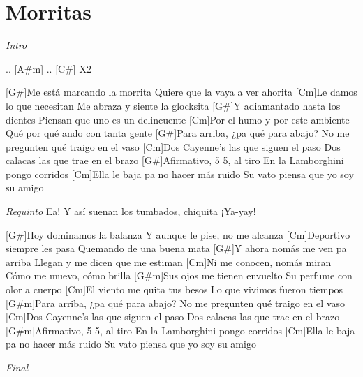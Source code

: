 \section{Morritas}

\noindent
\vspace{1cm}

\begin{guitar}
	\begin{multicols}{2}

		\textit{Intro}\par
		[G#]  ..  [A#m]  ..  [C#] X2

		[G#]Me está marcando la morrita
		Quiere que la vaya a ver ahorita
		[Cm]Le damos lo que necesitan
		Me abraza y siente la glocksita
		[G#]Y adiamantado hasta los dientes
		Piensan que uno es un delincuente
		[Cm]Por el humo y por este ambiente
		Qué por qué ando con tanta gente
		[G#]Para arriba, ¿pa qué para abajo?
		No me pregunten qué traigo en el vaso
		[Cm]Dos Cayenne's las que siguen el paso
		Dos calacas las que trae en el brazo
		[G#]Afirmativo, 5 5, al tiro
		En la Lamborghini pongo corridos
		[Cm]Ella le baja pa no hacer más ruido
		Su vato piensa que yo soy su amigo

		\par
		\textit{Requinto}
		Ea!
		Y así suenan los tumbados, chiquita
		¡Ya-yay!
		\par

		[G#]Hoy dominamos la balanza
		Y aunque le pise, no me alcanza
		[Cm]Deportivo siempre les pasa
		Quemando de una buena mata
		[G#]Y ahora nomás me ven pa arriba
		Llegan y me dicen que me estiman
		[Cm]Ni me conocen, nomás miran
		Cómo me muevo, cómo brilla
		[G#m]Sus ojos me tienen envuelto
		Su perfume con olor a cuerpo
		[Cm]El viento me quita tus besos
		Lo que vivimos fueron tiempos
		[G#m]Para arriba, ¿pa qué para abajo?
		No me pregunten qué traigo en el vaso
		[Cm]Dos Cayenne's las que siguen el paso
		Dos calacas las que trae en el brazo
		[G#m]Afirmativo, 5-5, al tiro
		En la Lamborghini pongo corridos
		[Cm]Ella le baja pa no hacer más ruido
		Su vato piensa que yo soy su amigo
		\par
		\textit{Final}


	\end{multicols}
\end{guitar}
